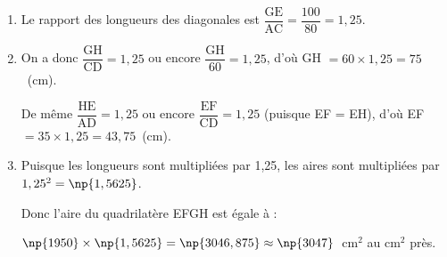 
\medskip

%
%
%

\begin{enumerate}
\item %
Le rapport des longueurs des diagonales est $\dfrac{\text{GE}}{\text{AC}} = \dfrac{100}{80} = 1,25$.
\item %

On a donc $\dfrac{\text{GH}}{\text{CD}} = 1,25$  ou encore $\dfrac{\text{GH}}{60} = 1,25$, d'où GH $ = 60 \times 1,25 = 75$~(cm).

De même $\dfrac{\text{HE}}{\text{AD}} = 1,25$ ou encore $\dfrac{\text{EF}}{\text{CD}}= 1,25$ (puisque EF = EH), d'où EF $= 35 \times 1,25 = 43,75$~(cm).
\item %
Puisque les longueurs sont multipliées par 1,25, les aires sont multipliées par $1,25^2 = \np{1,5625}$.

Donc l'aire du quadrilatère EFGH est égale à :

$\np{1950} \times \np{1,5625} = \np{3046,875}\approx \np{3047}$~cm$^2$ au cm$^2$ près.
\end{enumerate}

\vspace{0,5cm}

